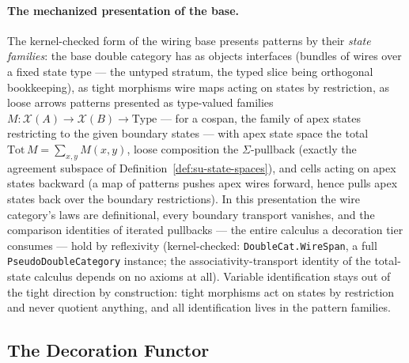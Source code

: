 \paragraph{The mechanized presentation of the base.} The
kernel-checked form of the wiring base presents patterns by their
\emph{state families}: the base double category has as objects
interfaces (bundles of wires over a fixed state type --- the untyped
stratum, the typed slice being orthogonal bookkeeping), as tight
morphisms wire maps acting on states by restriction, as loose arrows
patterns presented as type-valued families
$M \colon \mathcal{X}(A) \to \mathcal{X}(B) \to \mathrm{Type}$ ---
for a cospan, the family of apex states restricting to the given
boundary states --- with apex state space the total
$\mathrm{Tot}\,M = \sum_{x,y} M(x,y)$, loose composition the
$\Sigma$-pullback (exactly the agreement subspace of
Definition~\ref{def:su-state-spaces}), and cells acting on apex
states backward (a map of patterns pushes apex wires forward, hence
pulls apex states back over the boundary restrictions). In this
presentation the wire category's laws are definitional, every
boundary transport vanishes, and the comparison identities of
iterated pullbacks --- the entire calculus a decoration tier
consumes --- hold by reflexivity (kernel-checked:
\texttt{DoubleCat.WireSpan}, a full
\texttt{PseudoDoubleCategory} instance; the associativity-transport identity of the total-state
calculus depends on no axioms at all). Variable identification stays
out of the tight direction by construction:
tight morphisms act on states by restriction and never quotient
anything, and all identification lives in the pattern families.

\subsection{The Decoration Functor}

